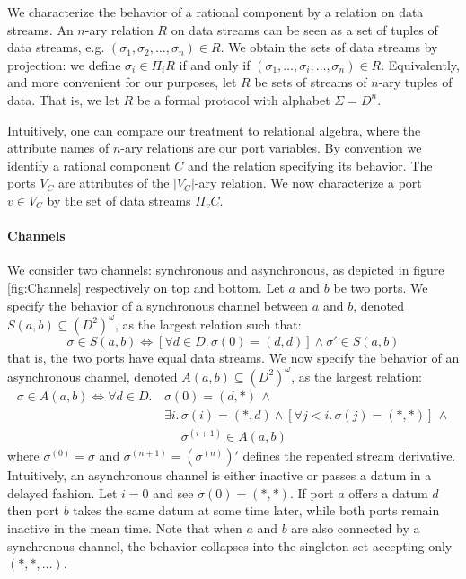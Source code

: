 We characterize the behavior of a rational component by a relation on data streams.
An $n$-ary relation $R$ on data streams can be seen as a set of tuples of data streams,
e.g. $(\sigma_{1},\sigma_{2},\ldots,\sigma_{n})\in R$.
We obtain the sets of data streams by projection:
we define $\sigma_i\in\Pi_i R$ if and only if $(\sigma_{1},\ldots,\sigma_i,\ldots,\sigma_{n})\in R$.
Equivalently, and more convenient for our purposes,
let $R$ be sets of streams of $n$-ary tuples of data.
That is, we let $R$ be a formal protocol with alphabet $\Sigma=D^{n}$.

Intuitively, one can compare our treatment to relational algebra,
where the attribute names of $n$-ary relations are our port variables.
By convention we identify a rational component $C$ and the relation specifying its behavior.
The ports $V_C$ are attributes of the $|V_C|$-ary relation.
We now characterize a port $v\in V_C$ by the set of data streams $\Pi_v C$.

\paragraph{Channels} We consider two channels: synchronous and asynchronous,
as depicted in figure \ref{fig:Channels} respectively on top and bottom.
Let $a$ and $b$ be two ports.
We specify the behavior of a synchronous channel between $a$ and $b$, denoted $S(a,b)\subseteq(D^2)^{\omega}$, as the largest relation such that:
$$\sigma\in S(a,b)\Leftrightarrow\left[\forall d\in D.\,\sigma(0)=(d,d)\right]\land\sigma'\in S(a,b)$$
that is, the two ports have equal data streams. We now specify the behavior of an asynchronous channel,
denoted $A(a,b)\subseteq(D^2)^{\omega}$, as the largest relation:
\begin{align*}
	\sigma\in A(a,b)\Leftrightarrow\forall d\in D.\, & \sigma(0)=(d,*)\,\land\\
	& \exists i.\,\sigma(i)=(*,d)\land\left[\forall j<i.\,\sigma(j)=(*,*)\right]\,\land\\
	& \phantom{\exists i.\,}\sigma^{(i+1)}\in A(a,b)
\end{align*}
where $\sigma^{(0)}=\sigma$ and $\sigma^{(n+1)}=\left(\sigma^{(n)}\right)'$ defines the repeated stream derivative.
Intuitively, an asynchronous channel is either inactive or passes a datum in a delayed fashion.
Let $i=0$ and see $\sigma(0)=(*,*)$.
If port $a$ offers a datum $d$ then port $b$  takes the same datum at some time later,
while both ports remain inactive in the mean time. Note that when $a$ and $b$ are also
connected by a synchronous channel, the behavior collapses into the singleton set accepting only $(*,*,\ldots)$.


